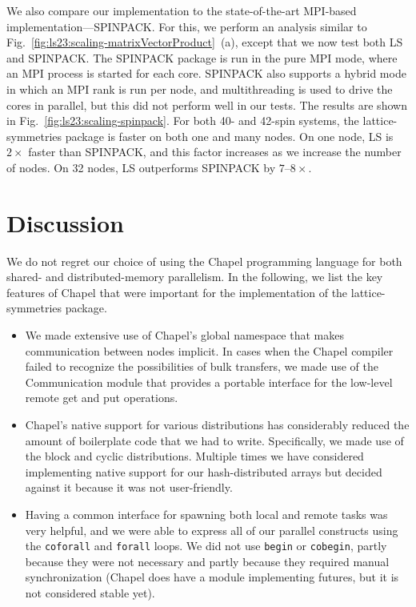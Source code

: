 We also compare our implementation to the state-of-the-art MPI-based implementation---SPINPACK. For this, we perform an analysis similar to Fig.~\ref{fig:ls23:scaling-matrixVectorProduct}~(a), except that we now test both LS and SPINPACK. The SPINPACK package is run in the pure MPI mode, where an MPI process is started for each core. SPINPACK also supports a hybrid mode in which an MPI rank is run per node, and multithreading is used to drive the cores in parallel, but this did not perform well in our tests. The results are shown in Fig.~\ref{fig:ls23:scaling-spinpack}. For both 40- and 42-spin systems, the lattice-symmetries package is faster on both one and many nodes. On one node, LS is $2\times$ faster than SPINPACK, and this factor increases as we increase the number of nodes. On 32 nodes, LS outperforms SPINPACK by $7$--$8\times$.

\section{Discussion}\label{sec:ls23:discussion}

We do not regret our choice of using the Chapel programming language for both shared- and distributed-memory parallelism. In the following, we list the key features of Chapel that were important for the implementation of the lattice-symmetries package.
\begin{itemize}[topsep=0pt,noitemsep]
  \item We made extensive use of Chapel's global namespace that makes communication between nodes implicit. In cases when the Chapel compiler failed to recognize the possibilities of bulk transfers, we made use of the Communication module that provides a portable interface for the low-level remote get and put operations.
  \item Chapel's native support for various distributions has considerably reduced the amount of boilerplate code that we had to write. Specifically, we made use of the block and cyclic distributions. Multiple times we have considered implementing native support for our hash-distributed arrays but decided against it because it was not user-friendly.
  \item Having a common interface for spawning both local and remote tasks was very helpful, and we were able to express all of our parallel constructs using the \verb|coforall| and \verb|forall| loops. We did not use \verb|begin| or \verb|cobegin|, partly because they were not necessary and partly because they required manual synchronization (Chapel does have a module implementing futures, but it is not considered stable yet).
\end{itemize}

